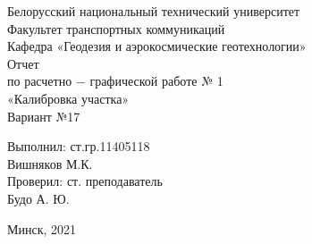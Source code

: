 \documentclass[a4paper]{article}
\begin{document}
\begin{titlepage}
\begin{center}
\large{Белорусский национальный технический университет}\\
\large{Факультет транспортных коммуникаций}\\
\large{Кафедра «Геодезия и аэрокосмические геотехнологии»}\\
\hfill \break
\hfill \break
\hfill \break
\hfill \break
\hfill \break
\hfill \break
\hfill \break
\large{Отчет\\
 по расчетно $-$ графической работе № 1\\
«Калибровка участка»\\
Вариант №17\\}
\hfill \break
\hfill \break
\hfill \break
\hfill \break
\hfill \break
\end{center}
\begin{flushright}
  \large{Выполнил: ст.гр.11405118\\
	Вишняков М.К.\\
	Проверил: ст. преподаватель\\
	Будо А. Ю.\\}
\end{flushright}
\begin{center}
\hfill \break
\hfill \break
\hfill \break
\large{Минск, 2021\\}
\end{center}
\end{titlepage}
\end{document}
